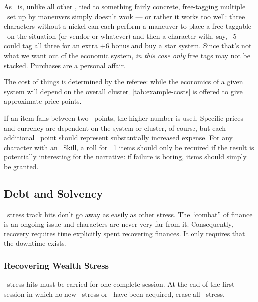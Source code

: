 As \Assets\ is, unlike all other \Skills, tied to something fairly concrete, free-tagging multiple \Aspects\ set up by maneuvers simply doesn't work --- or rather it works too well: three characters without a nickel can each perform a maneuver to place a free-taggable \Aspect\ on the situation (or vendor or whatever) and then a character with, say, \Assets\ 5 could tag all three for an extra +6 bonus and buy a star system. Since that's not what we want out of the economic system, \emph{in this case only} free tags may not be stacked. Purchases are a personal affair.

\vfil


The cost of things is determined by the referee: while the economics of a given system will depend on the overall cluster, \autoref{tab:example-costs} is offered to give approximate price-points.

If an item falls between two \Cost\ points, the higher number is used. Specific prices and currency are dependent on the system or cluster, of course, but each additional \Cost\ point should represent substantially increased expense. For any character with an \Assets\ Skill, a roll for \Cost\ 1 items should only be required if the result is potentially interesting for the narrative: if failure is boring, items should simply be granted.

\subsection{Debt and Solvency}
\label{sec:Debt and Solvency}

\Wealth\ stress track hits don't go away as easily as other stress. The ``combat'' of finance is an ongoing issue and characters are never very far from it. Consequently, recovery requires time explicitly spent recovering finances. It only requires that the downtime exists.

\subsubsection{Recovering Wealth Stress}

\Wealth\ stress hits must be carried for one complete session. At the end of the first session in which no new \Wealth\ stress or \Consequences\ have been acquired, erase all \Wealth\ stress.

